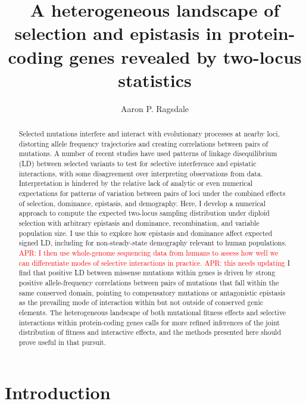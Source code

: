 \documentclass[]{article}
\newcommand{\comment}[1]{{\textcolor{red}{APR: #1}}}
\begin{document}
\title{A heterogeneous landscape of selection and epistasis in protein-coding genes revealed by two-locus statistics}
\author[]{Aaron P. Ragsdale}
\maketitle


\begin{abstract}

Selected mutations interfere and interact with evolutionary processes at nearby
loci, distorting allele frequency trajectories and creating correlations
between pairs of mutations. A number of recent studies have used patterns of
linkage disequilibrium (LD) between selected variants to test for selective
interference and epistatic interactions, with some disagreement over
interpreting observations from data. Interpretation is hindered by the relative
lack of analytic or even numerical expectations for patterns of variation
between pairs of loci under the combined effects of selection, dominance,
epistasis, and demography. Here, I develop a numerical approach to compute the
expected two-locus sampling distribution under diploid selection with arbitrary
epistasis and dominance, recombination, and variable population size. I use
this to explore how epistasis and dominance affect expected signed LD,
including for non-steady-state demography relevant to human populations.
\comment{I then use whole-genome sequencing data from humans to assess how well we
can differentiate modes of selective interactions in practice.}
\comment{this needs updating}
I find that
positive LD between missense mutations within genes is driven by strong
positive allele-frequency correlations between pairs of mutations that fall
within the same conserved domain, pointing to compensatory mutations or
antagonistic epistasis as the prevailing mode of interaction within but not
outside of conserved genic elements. The heterogeneous landscape of both
mutational fitness effects and selective interactions within protein-coding
genes calls for more refined inferences of the joint distribution of fitness
and interactive effects, and the methods presented here should prove useful in
that pursuit.

\end{abstract}

\section{Introduction}\label{sec:introduction}
\end{document}
